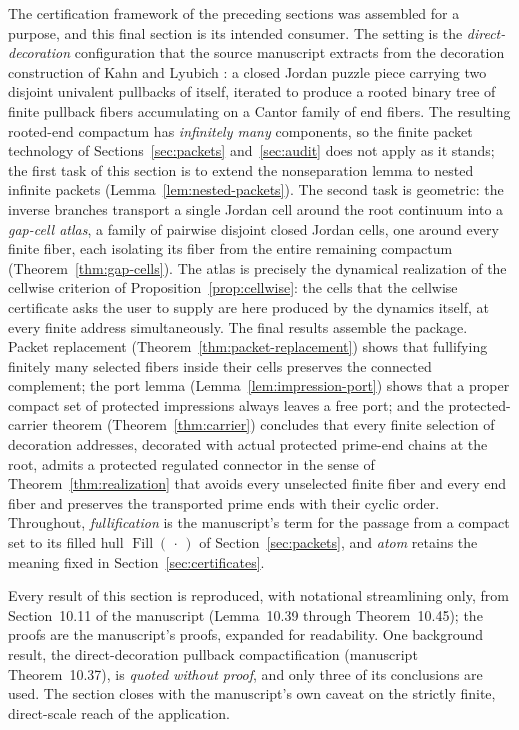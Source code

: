 \documentclass[11pt,reqno]{amsart}
\theoremstyle{definition}
\theoremstyle{remark}
\newcommand{\Fill}{\operatorname{Fill}}
\begin{document}
The certification framework of the preceding sections was assembled for a
purpose, and this final section is its intended consumer.  The setting is
the \emph{direct-decoration} configuration that the source manuscript
\cite{MWman} extracts from the decoration construction of Kahn and Lyubich
\cite{KL08}: a closed Jordan puzzle piece carrying two disjoint univalent
pullbacks of itself, iterated to produce a rooted binary tree of finite
pullback fibers accumulating on a Cantor family of end fibers.  The
resulting rooted-end compactum has \emph{infinitely many} components, so
the finite packet technology of Sections~\ref{sec:packets}
and~\ref{sec:audit} does not apply as it stands; the first task of this
section is to extend the nonseparation lemma to nested infinite packets
(Lemma~\ref{lem:nested-packets}).  The second task is geometric: the
inverse branches transport a single Jordan cell around the root continuum
into a \emph{gap-cell atlas}, a family of pairwise disjoint closed Jordan
cells, one around every finite fiber, each isolating its fiber from the
entire remaining compactum (Theorem~\ref{thm:gap-cells}).  The atlas is
precisely the dynamical realization of the cellwise criterion of
Proposition~\ref{prop:cellwise}: the cells that the cellwise certificate
asks the user to supply are here produced by the dynamics itself, at every
finite address simultaneously.  The final results assemble the package.
Packet replacement (Theorem~\ref{thm:packet-replacement}) shows that
fullifying finitely many selected fibers inside their cells preserves the
connected complement; the port lemma (Lemma~\ref{lem:impression-port})
shows that a proper compact set of protected impressions always leaves a
free port; and the protected-carrier theorem (Theorem~\ref{thm:carrier})
concludes that every finite selection of decoration addresses, decorated
with actual protected prime-end chains at the root, admits a protected
regulated connector in the sense of Theorem~\ref{thm:realization} that
avoids every unselected finite fiber and every end fiber and preserves the
transported prime ends with their cyclic order.  Throughout,
\emph{fullification} is the manuscript's term for the passage from a
compact set to its filled hull $\Fill(\,\cdot\,)$ of
Section~\ref{sec:packets}, and \emph{atom} retains the meaning fixed in
Section~\ref{sec:certificates}.

Every result of this section is reproduced, with notational streamlining
only, from Section~10.11 of the manuscript \cite{MWman}
(Lemma~10.39 through Theorem~10.45); the proofs are the manuscript's
proofs, expanded for readability.  One background result, the
direct-decoration pullback compactification (manuscript Theorem~10.37), is
\emph{quoted without proof}, and only three of its conclusions are used.
The section closes with the manuscript's own caveat on the strictly
finite, direct-scale reach of the application.
\end{document}
